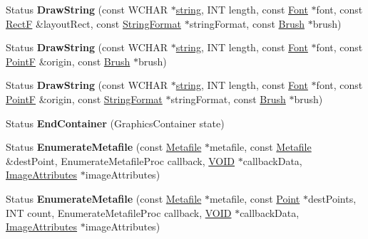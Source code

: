 \begin{DoxyCompactItemize}
Status {\bfseries Draw\+String} (const W\+C\+H\+AR $\ast$\hyperlink{structstring}{string}, I\+NT length, const \hyperlink{class_font}{Font} $\ast$font, const \hyperlink{struct_rect_f}{RectF} \&layout\+Rect, const \hyperlink{class_string_format}{String\+Format} $\ast$string\+Format, const \hyperlink{class_brush}{Brush} $\ast$brush)
\item 
\mbox{\label{class_graphics_a19a260abddd1020c388f821c2e3d0339}} 
Status {\bfseries Draw\+String} (const W\+C\+H\+AR $\ast$\hyperlink{structstring}{string}, I\+NT length, const \hyperlink{class_font}{Font} $\ast$font, const \hyperlink{struct_point_f}{PointF} \&origin, const \hyperlink{class_brush}{Brush} $\ast$brush)
\item 
\mbox{\label{class_graphics_a5c985b1fa789b9664ed68c88d0a93092}} 
Status {\bfseries Draw\+String} (const W\+C\+H\+AR $\ast$\hyperlink{structstring}{string}, I\+NT length, const \hyperlink{class_font}{Font} $\ast$font, const \hyperlink{struct_point_f}{PointF} \&origin, const \hyperlink{class_string_format}{String\+Format} $\ast$string\+Format, const \hyperlink{class_brush}{Brush} $\ast$brush)
\item 
\mbox{\label{class_graphics_ad9de62ec76c7bb0992cd0f20ab208d39}} 
Status {\bfseries End\+Container} (Graphics\+Container state)
\item 
\mbox{\label{class_graphics_ac031d693ae62a386e9bf169a8414bc96}} 
Status {\bfseries Enumerate\+Metafile} (const \hyperlink{class_metafile}{Metafile} $\ast$metafile, const \hyperlink{class_metafile}{Metafile} \&dest\+Point, Enumerate\+Metafile\+Proc callback, \hyperlink{interfacevoid}{V\+O\+ID} $\ast$callback\+Data, \hyperlink{class_image_attributes}{Image\+Attributes} $\ast$image\+Attributes)
\item 
\mbox{\label{class_graphics_a06b8c918fdb2582928a6380b94fee77c}} 
Status {\bfseries Enumerate\+Metafile} (const \hyperlink{class_metafile}{Metafile} $\ast$metafile, const \hyperlink{struct_point}{Point} $\ast$dest\+Points, I\+NT count, Enumerate\+Metafile\+Proc callback, \hyperlink{interfacevoid}{V\+O\+ID} $\ast$callback\+Data, \hyperlink{class_image_attributes}{Image\+Attributes} $\ast$image\+Attributes)
\item 
\mbox{\label{class_graphics_ae6af4288cf45244e3b9db0697eab0da7}} 

\end{DoxyCompactItemize}

